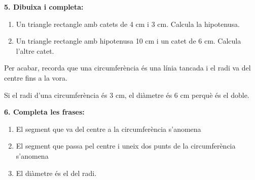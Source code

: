 \documentclass[12pt,a4paper]{article}
\begin{document}
\textbf{5. Dibuixa i completa:}

\begin{enumerate}[label=\alph*)]
    \item Un triangle rectangle amb catets de 4 cm i 3 cm. Calcula la hipotenusa. \vspace{1.2cm}
    \item Un triangle rectangle amb hipotenusa 10 cm i un catet de 6 cm. Calcula l'altre catet. \vspace{1.2cm}
\end{enumerate}

\begin{center}
\end{center}

\begin{capsula}
Per acabar, recorda que una circumferència és una línia tancada i el radi va del centre fins a la vora.
\end{capsula}

\begin{exemple}
Si el radi d'una circumferència és 3 cm, el diàmetre és 6 cm perquè és el doble.
\end{exemple}

\newpage
\textbf{6. Completa les frases:}
\begin{enumerate}[label=\alph*)]
    \item El segment que va del centre a la circumferència s'anomena \dotfill \vspace{0.6cm}
    \item El segment que passa pel centre i uneix dos punts de la circumferència s'anomena \dotfill \vspace{0.6cm}
    \item El diàmetre és el \dotfill del radi. \vspace{0.6cm}
\end{enumerate}

\begin{center}
\end{center}

 
\end{document}
